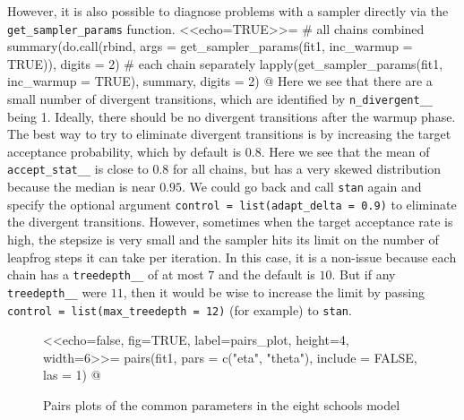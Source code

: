 \documentclass[12pt]{article}
\newcommand{\code}[1]{{\tt #1}}
\begin{document}
                However, it is also possible to diagnose problems with a sampler directly
                via the \code{get\_sampler\_params} function.
                <<echo=TRUE>>=
                  # all chains combined
                  summary(do.call(rbind, args = get_sampler_params(fit1, inc_warmup = TRUE)),
                          digits = 2)
                # each chain separately
                lapply(get_sampler_params(fit1, inc_warmup = TRUE), summary, digits = 2)
                @
                  Here we see that there are a small number of divergent transitions, which are identified
                by \code{n\_divergent\_\_} being 1. Ideally, there should be no divergent transitions
                after the warmup phase. The best way to try to eliminate divergent transitions is by
                increasing the target acceptance probability, which by default is $0.8$. Here we see
                that the mean of \code{accept\_stat\_\_} is close to $0.8$ for all chains, but has
                a very skewed distribution because the median is near $0.95$. We could go back and
                call \code{stan} again and specify the optional argument 
                \code{control = list(adapt\_delta = 0.9)} to eliminate the divergent transitions.
                However, sometimes when the target acceptance rate is high, the stepsize is very
                small and the sampler hits its limit on the number of leapfrog steps it can take
                per iteration. In this case, it is a non-issue because each chain has a
                \code{treedepth\_\_} of at most $7$ and the default is $10$. But if any 
                \code{treedepth\_\_} were $11$, then it would be wise to increase the limit by
                passing \code{control = list(max\_treedepth = 12)} (for example) to \code{stan}.
                
                \begin{figure}[ht]
                \centering
                <<echo=false, fig=TRUE, label=pairs_plot, height=4, width=6>>=
                  pairs(fit1, pars = c("eta", "theta"), include = FALSE, las = 1)
                @
                  \caption{Pairs plots of the common parameters in the eight schools model}
                \label{fig0pairsplot}
                \end{figure}
                
\end{document}
